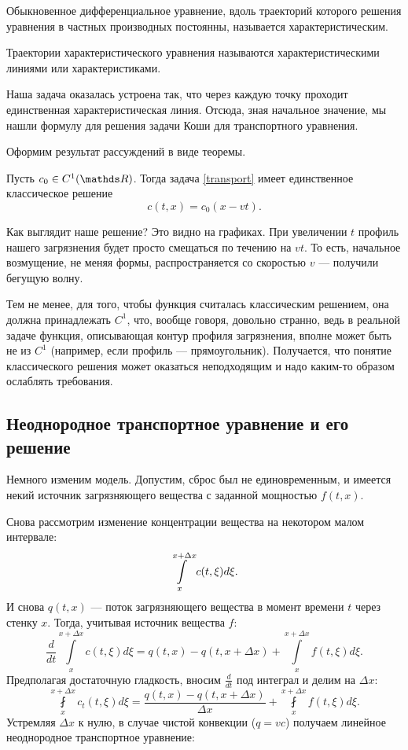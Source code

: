 \begin{definition} Обыкновенное дифференциальное уравнение, вдоль траекторий которого решения уравнения в частных производных постоянны, называется характеристическим.
\end{definition}

\begin{definition} Траектории характеристического уравнения называются характеристическими линиями или характеристиками.
\end{definition}

Наша задача оказалась устроена так, что через каждую точку проходит единственная характеристическая линия. Отсюда, зная начальное значение, мы нашли формулу для решения задачи Коши для транспортного уравнения.

Оформим результат рассуждений в виде теоремы.

\begin{theorem}
Пусть $c_0 \in C^1(\real)$. Тогда задача \eqref{transport} имеет единственное классическое решение $$ c (t,x) = c_0 (x - v t) .$$
\end{theorem}



Как выглядит наше решение? Это видно на графиках. При увеличении $t$ профиль нашего загрязнения будет просто смещаться по течению на $vt$. То есть, начальное возмущение, не меняя формы, распространяется со скоростью $v$ --- получили бегущую волну.

Тем не менее, для того, чтобы функция считалась классическим решением, она должна принадлежать $C^1$, что, вообще говоря, довольно странно, ведь в реальной задаче функция, описывающая контур профиля загрязнения, вполне может быть не из $C^1$ (например, если профиль --- прямоугольник). Получается, что понятие классического решения может оказаться неподходящим и надо каким-то образом ослаблять требования.

\subsection{Неоднородное транспортное уравнение и его решение}

Немного изменим модель. Допустим, сброс был не единовременным, и имеется некий источник загрязняющего вещества с заданной мощностью $f(t,x)$. %

Снова рассмотрим изменение концентрации вещества на некотором малом интервале:
$$ \displaystyle \int \limits_x^{x + \Delta x} c (t, \xi) d \xi .$$
И снова $ q (t, x) $ --- поток загрязняющего вещества в момент времени $t$ через стенку $x$. Тогда, учитывая источник вещества $f$:
$$ \frac{d}{dt} \int \limits_x^{x + \Delta x} c(t, \xi ) d \xi = q(t, x) - q(t, x + \Delta x) + \int \limits_x^{x+\Delta x} f(t,\xi) d\xi. $$
Предполагая достаточную гладкость, вносим $ \displaystyle \frac {d} {dt} $ под интеграл и делим на $ \Delta x $:
$$ \fint \limits_x^{x + \Delta x} c_t (t, \xi) d \xi  = \frac {q  (t, x) - q (t, x + \Delta x)}  {\Delta x} + \fint \limits_x^{x+\Delta x} f(t,\xi) d\xi. $$
Устремляя $ \Delta x$ к нулю, в случае чистой конвекции ($ q = vc $) получаем линейное неоднородное транспортное уравнение:


